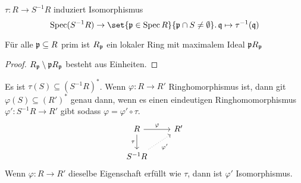 \begin{Kor}
    $\tau\colon R\to S^{-1}R$ induziert Isomorphismus $$\Spec(S^{-1}R)\to \set{\frakp\in\Spec R}{\frakp\cap S\neq\emptyset}.\, \frakq\mapsto \tau^{-1}(\frakq)$$
\end{Kor}
\begin{Kor}
    Für alle $\mathfrak{p}\subseteq R$ prim ist $R_{\mathfrak{p}}$ ein lokaler Ring mit maximalem Ideal $\mathfrak{p} R_{\mathfrak{p}}$
\end{Kor}
\begin{proof}
    $R_{\mathfrak{p}}\setminus \mathfrak{p} R_{\mathfrak{p}}$ besteht aus Einheiten.
\end{proof}
\begin{Satz}\label{Satz:UnivEigLok}
Es ist $\tau(S)\subseteq (S^{-1}R)^*$. Wenn $\varphi\colon R\to R'$ Ringhomorphismus ist, dann git $\varphi(S)\subseteq (R')^*$ genau dann, wenn es einen eindeutigen Ringhomomorphismus $\varphi'\colon S^{-1}R\to R'$ gibt sodass $\varphi=\varphi'\circ\tau.$
$$%
\begin{tikzcd}
R \arrow[d, "\tau"'] \arrow[r, "\varphi"] & R' \\
S^{-1}R \arrow[ru, "\varphi'"', dotted]   &   
\end{tikzcd}$$
Wenn $\varphi\colon R\to R'$ dieselbe Eigenschaft erfüllt wie $\tau$, dann ist $\varphi'$ Isomorphismus.
\end{Satz}

